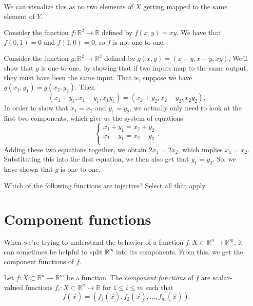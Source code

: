 \documentclass{ximera}
\begin{document}
We can visualize this as no two elements of $X$ getting mapped to the same element of $Y$.

\begin{example}
Consider the function $f:\mathbb{R}^2\rightarrow\mathbb{R}$ defined by $f(x,y) = xy$. We have that $f(0,1) = 0$ and $f(1,0)=0$, so $f$ is not one-to-one.

Consider the function $g:\mathbb{R}^2\rightarrow\mathbb{R}^3$ defined by $g(x,y) = (x+y, x-y, xy)$. We'll show that $g$ is one-to-one, by showing that if two inputs map to the same output, they must have been the same input. That is, suppose we have $g(x_1,y_1) = g(x_2,y_2)$. Then
\[
(x_1+y_1, x_1-y_1, x_1y_1) = (x_2+y_2, x_2-y_2, x_2y_2).
\]
In order to show that $x_1=x_2$ and $y_1=y_2$, we actually only need to look at the first two components, which give us the system of equations
\[
\begin{cases}
x_1+y_1 = x_2+y_2\\
x_1-y_1 = x_2-y_2\\
\end{cases}.
\]
Adding these two equations together, we obtain $2x_1 = 2x_2$, which implies $x_1 = x_2$. Substituting this into the first equation, we then also get that $y_1=y_2$. So, we have shown that $g$ is one-to-one.
\end{example}

\begin{problem}
Which of the following functions are injective? Select all that apply.
\begin{selectAll}
\end{selectAll}
\end{problem}

\section*{Component functions}

When we're trying to understand the behavior of a function $f:X\subset \mathbb{R}^n\rightarrow \mathbb{R}^m$, it can sometimes be helpful to split $\mathbb{R}^m$ into its components. From this, we get the component functions of $f$.

\begin{definition}
Let $f:X\subset \mathbb{R}^n\rightarrow \mathbb{R}^m$ be a function. The \emph{component functions} of $f$ are scalar-valued functions $f_i:X\subset\mathbb{R}^n\rightarrow\mathbb{R}$ for $1\leq i\leq m$ such that 
\[
f(\vec{x}) = (f_1(\vec{x}),f_2(\vec{x}),...,f_m(\vec{x})).
\]
\end{definition}
\end{document}
